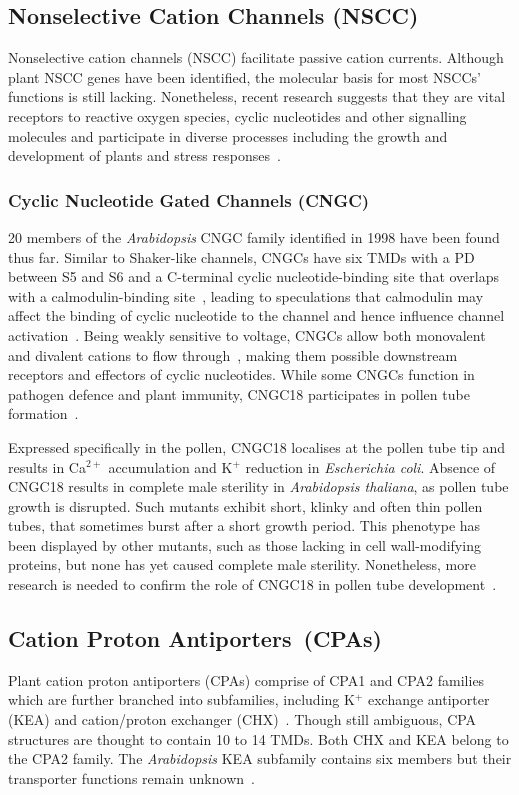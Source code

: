 \documentclass[11pt]{article}
\begin{document}
\begin{multicols*}{2}
\subsection{Nonselective Cation Channels (NSCC)}
Nonselective cation channels (NSCC) facilitate passive cation currents. Although plant NSCC genes have been identified, the molecular basis for most NSCCs' functions is still lacking. Nonetheless, recent research suggests that they are vital receptors to reactive oxygen species, cyclic nucleotides and other signalling molecules and participate in diverse processes including the growth and development of plants and stress responses~\citep{Demidchik2007}.

\subsubsection{Cyclic Nucleotide Gated Channels (CNGC)}
20 members of the \textit{Arabidopsis} CNGC family identified in 1998 have been found thus far. Similar to Shaker-like channels, CNGCs have six TMDs with a PD between S5 and S6 and a C-terminal cyclic nucleotide-binding site that overlaps with a calmodulin-binding site~\citep{Demidchik2002}, leading to speculations that calmodulin may affect the binding of cyclic nucleotide to the channel and hence influence channel activation~\citep{Arazi2000}. Being weakly sensitive to voltage, CNGCs allow both monovalent and divalent cations to flow through~\citep{Talke2003}, making them possible downstream receptors and effectors of cyclic nucleotides. While some CNGCs function in pathogen defence and plant immunity, CNGC18 participates in pollen tube formation~\citep{Dietrich2010}. 

Expressed specifically in the pollen, CNGC18 localises at the pollen tube tip and results in Ca$^{2+}$ accumulation and K$^{+}$ reduction in \textit{Escherichia coli}. Absence of CNGC18 results in complete male sterility in \textit{Arabidopsis thaliana}, as pollen tube growth is disrupted. Such mutants exhibit short, klinky and often thin pollen tubes, that sometimes burst after a short growth period. This phenotype has been displayed by other mutants, such as those lacking in cell wall-modifying proteins, but none has yet caused complete male sterility. Nonetheless, more research is needed to confirm the role of CNGC18 in pollen tube development~\citep{Frietsch2007}.

\subsection{Cation Proton Antiporters~(CPAs)}
Plant cation proton antiporters (CPAs) comprise of CPA1 and CPA2 families which are further branched into subfamilies, including K$^{+}$ exchange antiporter (KEA) and cation/proton exchanger (CHX)~\citep{Maser2001}. Though still ambiguous, CPA structures are thought to contain 10 to 14 TMDs. Both CHX and KEA belong to the CPA2 family. The \textit{Arabidopsis} KEA subfamily contains six members but their transporter functions remain unknown~\citep{Chen2008}. 


\end{multicols*}
\end{document}
